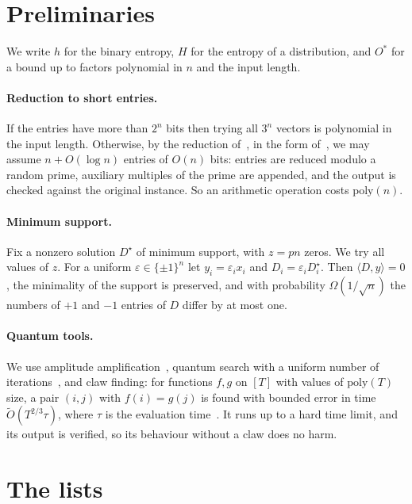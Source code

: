 \documentclass[11pt]{article}
\theoremstyle{remark}
\newcommand{\Ot}{\tilde O}
\newcommand{\ip}[2]{\langle #1,#2\rangle}
\begin{document}
\section{Preliminaries}

We write $h$ for the binary entropy, $H$ for the entropy of a distribution, and $O^*$ for a bound up to factors polynomial in $n$ and the input length.

\paragraph{Reduction to short entries.} If the entries have more than $2^n$ bits then trying all $3^n$ vectors is polynomial in the input length. Otherwise, by the reduction of~\cite{MNPW19}, in the form of~\cite[Lemma 1.1]{Ye26}, we may assume $n+O(\log n)$ entries of $O(n)$ bits: entries are reduced modulo a random prime, auxiliary multiples of the prime are appended, and the output is checked against the original instance. So an arithmetic operation costs $\mathrm{poly}(n)$.

\paragraph{Minimum support.} Fix a nonzero solution $D^\star$ of minimum support, with $z=pn$ zeros. We try all values of $z$. For a uniform $\varepsilon\in\{\pm1\}^n$ let $y_i=\varepsilon_ix_i$ and $D_i=\varepsilon_iD_i^\star$. Then $\ip Dy=0$, the minimality of the support is preserved, and with probability $\Omega(1/\sqrt n)$ the numbers of $+1$ and $-1$ entries of $D$ differ by at most one.

\paragraph{Quantum tools.} We use amplitude amplification~\cite{BHMT02}, quantum search with a uniform number of iterations~\cite{BBHT98}, and claw finding: for functions $f,g$ on $[T]$ with values of $\mathrm{poly}(T)$ size, a pair $(i,j)$ with $f(i)=g(j)$ is found with bounded error in time $\Ot(T^{2/3}\tau)$, where $\tau$ is the evaluation time~\cite{Tan09,Amb07}. It runs up to a hard time limit, and its output is verified, so its behaviour without a claw does no harm.

\section{The lists}\label{sec:lists}
\end{document}
